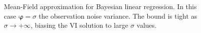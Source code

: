 \begin{figure}[t]
 \centering
 \hspace{0.5in}
 \caption{Mean-Field approximation for Bayesian linear regression. In this case $\bm{\varphi} = \sigma$ the observation noise variance. The bound is tight as $\sigma \rightarrow +\infty$, biasing the VI solution to large $\sigma$ values.}
\end{figure}